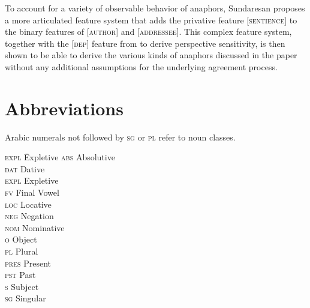 \documentclass[output=paper
,modfonts
,nonflat]{langsci/langscibook}
\begin{document}
To account for a variety of observable behavior of anaphors, Sundaresan proposes a more articulated feature system that adds the privative feature [\textsc{sentience}] to the binary features of [\textsc{author}] and [\textsc{addressee}]. This complex feature system, together with the [\textsc{dep}] feature from \citet{sundaresan2012} to derive perspective sensitivity, is then shown to be able to derive the various kinds of anaphors discussed in the paper without any additional assumptions for the underlying agreement process.

\section*{Abbreviations}

Arabic numerals not followed by \textsc{sg} or \textsc{pl} refer to noun classes.

\begin{multicols}{3}
	\begin{tabbing}
\textsc{expl}\hspace{5mm} \= Expletive\kill
		\textsc{abs} 	\> Absolutive \\
		\textsc{dat} 	\> Dative	\\
		\textsc{expl} 	\> Expletive \\
		\textsc{fv} 	\> Final Vowel	\\
		\textsc{loc} 	\> Locative \\
		\textsc{neg} 	\> Negation \\
		\textsc{nom} 	\> Nominative 	\\	
		\textsc{o} \> Object 	\\
		\textsc{pl} \> Plural	\\
		\textsc{pres} \> Present	\\
		\textsc{pst} \> Past	\\
		\textsc{s} \> Subject	\\
		\textsc{sg} \> Singular\\
\end{tabbing}
\end{multicols}

{\sloppy\printbibliography[heading=subbibliography,notkeyword=this]}
\end{document}

